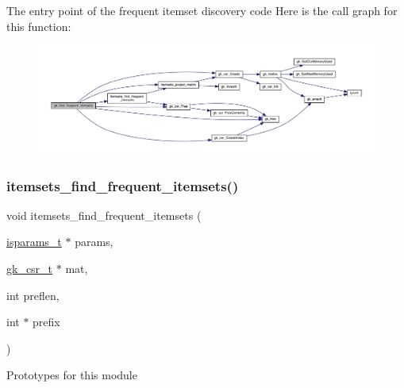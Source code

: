 The entry point of the frequent itemset discovery code Here is the call graph for this function\+:\nopagebreak
\begin{figure}[H]
\begin{center}
\leavevmode
\includegraphics[width=350pt]{a00104_abc9e8f6a3efe2f0f3ec79b5d8883b246_cgraph}
\end{center}
\end{figure}
\mbox{\label{a00104_ab19ae99e1e3ba575373cf0fe846a8cd9}} 
\subsubsection{\texorpdfstring{itemsets\+\_\+find\+\_\+frequent\+\_\+itemsets()}{itemsets\_find\_frequent\_itemsets()}}
{\footnotesize\ttfamily void itemsets\+\_\+find\+\_\+frequent\+\_\+itemsets (\begin{DoxyParamCaption}\item[{\hyperlink{a00698}{isparams\+\_\+t} $\ast$}]{params,  }\item[{\hyperlink{a00634}{gk\+\_\+csr\+\_\+t} $\ast$}]{mat,  }\item[{int}]{preflen,  }\item[{int $\ast$}]{prefix }\end{DoxyParamCaption})}

Prototypes for this module

